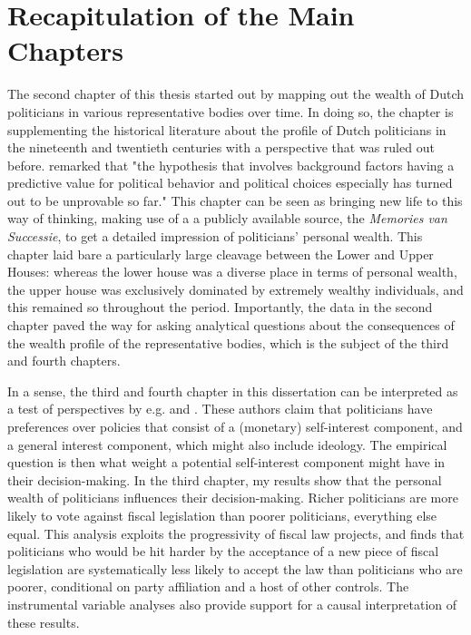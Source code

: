 \section{Recapitulation of the Main Chapters}\label{sec:recap}
The second chapter of this thesis started out by mapping out the wealth of Dutch politicians in various representative bodies over time. In doing so, the chapter is supplementing the historical literature about the profile of Dutch politicians in the nineteenth and twentieth centuries \citep{van1983toegang, secker1991ministers, van1999eerste, oomen2020werk} with a perspective that was ruled out before. \cite{van1983toegang} remarked that "the hypothesis that involves background factors having a predictive value for political behavior and political choices especially has turned out to be unprovable so far." This chapter can be seen as bringing new life to this way of thinking, making use of a a publicly available source, the \textit{Memories van Successie}, to get a detailed impression of politicians' personal wealth. This chapter laid bare a particularly large cleavage between the Lower and Upper Houses: whereas the lower house was a diverse place in terms of personal wealth, the upper house was exclusively dominated by extremely wealthy individuals, and this remained so throughout the period. Importantly, the data in the second chapter paved the way for asking analytical questions about the consequences of the wealth profile of the representative bodies, which is the subject of the third and fourth chapters. 

In a sense, the third and fourth chapter in this dissertation can be interpreted as a test of perspectives by e.g. \cite{tahoun2019personal} and \cite{grossman1996electoral}. These authors claim that politicians have preferences over policies that consist of a (monetary) self-interest component, and a general interest component, which might also include ideology. The empirical question is then what weight a potential self-interest component might have in their decision-making. In the third chapter, my results show that the personal wealth of politicians influences their decision-making. Richer politicians are more likely to vote against fiscal legislation than poorer politicians, everything else equal. This analysis exploits the progressivity of fiscal law projects, and finds that politicians who would be hit harder by the acceptance of a new piece of fiscal legislation are systematically less likely to accept the law than politicians who are poorer, conditional on party affiliation and a host of other controls. The instrumental variable analyses also provide support for a causal interpretation of these results. 

